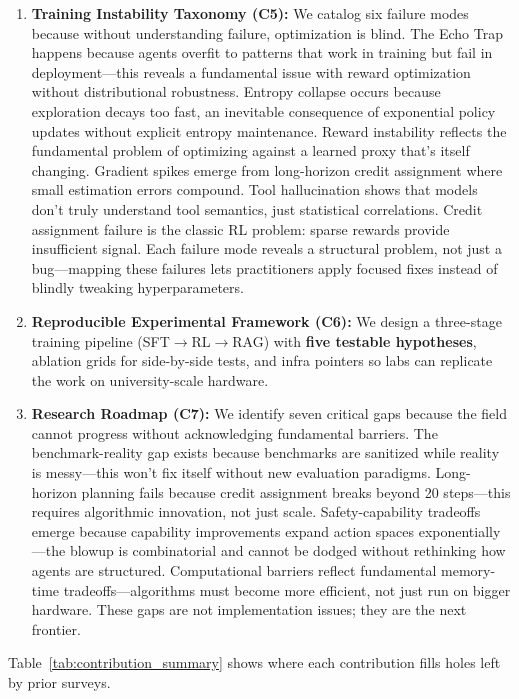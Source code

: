 \documentclass[12pt,a4paper]{report}
\theoremstyle{definition}
\begin{document}
\begin{enumerate}
    \item \textbf{Training Instability Taxonomy (C5):} We catalog six failure modes because without understanding failure, optimization is blind. The Echo Trap happens because agents overfit to patterns that work in training but fail in deployment—this reveals a fundamental issue with reward optimization without distributional robustness. Entropy collapse occurs because exploration decays too fast, an inevitable consequence of exponential policy updates without explicit entropy maintenance. Reward instability reflects the fundamental problem of optimizing against a learned proxy that's itself changing. Gradient spikes emerge from long-horizon credit assignment where small estimation errors compound. Tool hallucination shows that models don't truly understand tool semantics, just statistical correlations. Credit assignment failure is the classic RL problem: sparse rewards provide insufficient signal. Each failure mode reveals a structural problem, not just a bug—mapping these failures lets practitioners apply focused fixes instead of blindly tweaking hyperparameters.

    \item \textbf{Reproducible Experimental Framework (C6):} We design a three-stage training pipeline (SFT$\rightarrow$RL$\rightarrow$RAG) with \textbf{five testable hypotheses}, ablation grids for side-by-side tests, and infra pointers so labs can replicate the work on university-scale hardware.

    \item \textbf{Research Roadmap (C7):} We identify seven critical gaps because the field cannot progress without acknowledging fundamental barriers. The benchmark-reality gap exists because benchmarks are sanitized while reality is messy—this won't fix itself without new evaluation paradigms. Long-horizon planning fails because credit assignment breaks beyond 20 steps—this requires algorithmic innovation, not just scale. Safety-capability tradeoffs emerge because capability improvements expand action spaces exponentially—the blowup is combinatorial and cannot be dodged without rethinking how agents are structured. Computational barriers reflect fundamental memory-time tradeoffs—algorithms must become more efficient, not just run on bigger hardware. These gaps are not implementation issues; they are the next frontier.
\end{enumerate}

\noindent Table~\ref{tab:contribution_summary} shows where each contribution fills holes left by prior surveys.
\end{document}
